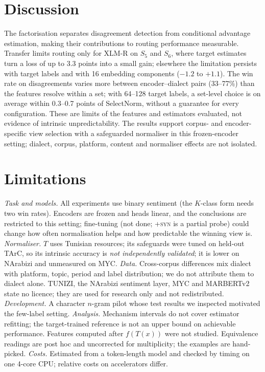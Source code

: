 \section{Discussion}
\label{sec:discussion}

The factorisation separates disagreement detection from conditional advantage estimation, making their contributions to routing performance measurable. Transfer limits routing only for XLM-R on $S_5$ and $S_6$, where target estimates turn a loss of up to 3.3 points into a small gain; elsewhere the limitation persists with target labels and with 16 embedding components ($-1.2$ to $+1.1$). The win rate on disagreements varies more between encoder--dialect pairs (33--77\%) than the features resolve within a set; with 64--128 target labels, a set-level choice is on average within 0.3--0.7 points of SelectNorm, without a guarantee for every configuration. These are limits of the features and estimators evaluated, not evidence of intrinsic unpredictability. The results support corpus- and encoder-specific view selection with a safeguarded normaliser in this frozen-encoder setting; dialect, corpus, platform, content and normaliser effects are not isolated.

\section{Limitations}
\label{sec:limitations}
\emph{Task and models.} All experiments use binary sentiment (the $K$-class form needs two win rates). Encoders are frozen and heads linear, and the conclusions are restricted to this setting; fine-tuning (not done; \textsc{+syn} is a partial probe) could change how often normalisation helps and how predictable the winning view is.
\emph{Normaliser.} $T$ uses Tunisian resources; its safeguards were tuned on held-out TArC, so its intrinsic accuracy is \emph{not independently validated}; it is lower on NArabizi and unmeasured on MYC.
\emph{Data.} Cross-corpus differences mix dialect with platform, topic, period and label distribution; we do not attribute them to dialect alone. TUNIZI, the NArabizi sentiment layer, MYC and MARBERTv2 state no licence; they are used for research only and not redistributed.
\emph{Development.} A character $n$-gram pilot whose test results we inspected motivated the few-label setting.
\emph{Analysis.} Mechanism intervals do not cover estimator refitting; the target-trained reference is not an upper bound on achievable performance. Features computed after $f(T(x))$ were not studied. Equivalence readings are post hoc and uncorrected for multiplicity; the examples are hand-picked.
\emph{Costs.} Estimated from a token-length model and checked by timing on one 4-core CPU; relative costs on accelerators differ.
